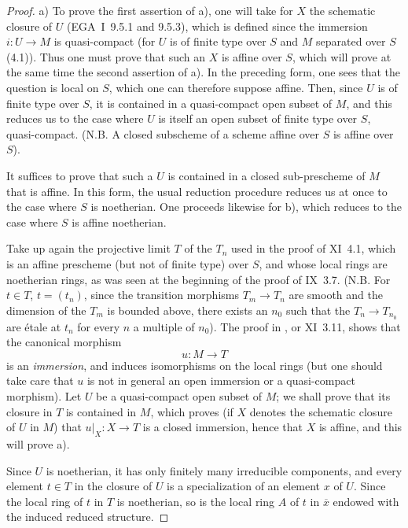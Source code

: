 \begin{proof}
a) To prove the first assertion of a), one will take for $X$ the schematic closure of $U$ (EGA~I~9.5.1 and 9.5.3), which is defined since the immersion $i:U\to M$ is quasi-compact (for $U$ is of finite type over $S$ and $M$ separated over $S$ (4.1)). Thus one must prove that such an $X$ is affine over $S$, which will prove at the same time the second assertion of a). In the preceding form, one sees that the question is local on $S$, which one can therefore suppose affine. Then, since $U$ is of finite type over $S$, it is contained in a quasi-compact open subset of $M$, and this reduces us to the case where $U$ is itself an open subset of finite type over $S$, \ie quasi-compact. (N.B. A closed subscheme of a scheme affine over $S$ is affine over $S$).

It suffices to prove that such a $U$ is contained in a closed sub-prescheme of $M$ that is affine. In this form, the usual reduction procedure reduces us at once to the case where $S$ is noetherian. One proceeds likewise for b), which reduces to the case where $S$ is affine noetherian.

Take up again the projective limit $T$ of the $T_n$ used in the proof of XI~4.1, which is an affine prescheme (but not of finite type) over $S$, and whose local rings are noetherian rings, as was seen at the beginning of the proof of IX~3.7. (N.B. For $t\in T$, $t=(t_n)$, since the transition morphisms $T_m\to T_n$ are smooth and the dimension of the $T_m$ is bounded above, there exists an $n_0$ such that the $T_n\to T_{n_0}$ are étale at $t_n$ for every $n$ a multiple of $n_0$). The proof in \loccit, or XI~3.11, shows that the canonical morphism
\[
u:M\to T
\]
is an \emph{immersion}, and induces isomorphisms on the local rings (but one should take care that $u$ is not in general an open immersion or a quasi-compact morphism). Let $U$ be a quasi-compact open subset of $M$; we shall prove that its closure in $T$ is contained in $M$, which proves (if $X$ denotes the schematic closure of $U$ in $M$) that $u|_X:X\to T$ is a closed immersion, hence that $X$ is affine, and this will prove a).

Since $U$ is noetherian, it has only finitely many irreducible components, and every element $t\in T$ in the closure of $U$ is a specialization of an element $x$ of $U$. Since the local ring of $t$ in $T$ is noetherian, so is the local ring $A$ of $t$ in $\overline x$ endowed with the induced reduced structure.


\end{proof}
